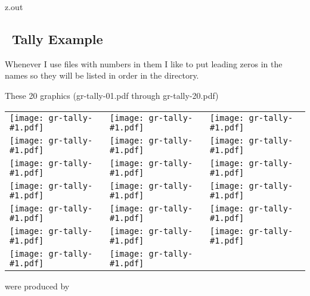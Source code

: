\begin{VerbatimOut}{z.out}

\subsection{\METAPOSTLogo\ Tally Example}
\label{ss:tally-example}

Whenever I use files with numbers in them I like to put leading zeros
in the names so they will be listed in order in the directory.

These 20 graphics (gr-tally-01.pdf through gr-tally-20.pdf)

\vspace*{6pt}

{%
  \def\g#1/{\texttt{[image: gr-tally-\#1.pdf]}}%

  \begin{tabular*}{\textwidth}{@{\kern2\parindent}@{\extracolsep{\fill}}lll@{\kern2\parindent}}%
    \g 01/& \g 02/& \g 03/\\
    \g 04/& \g 05/& \g 06/\\
    \g 07/& \g 08/& \g 09/\\
    \g 10/& \g 11/& \g 12/\\
    \g 13/& \g 14/& \g 15/\\
    \g 16/& \g 17/& \g 18/\\
    \g 19/& \g 20/\\
  \end{tabular*}%
}
\noindent were produced by


\end{VerbatimOut}

\MyIO


